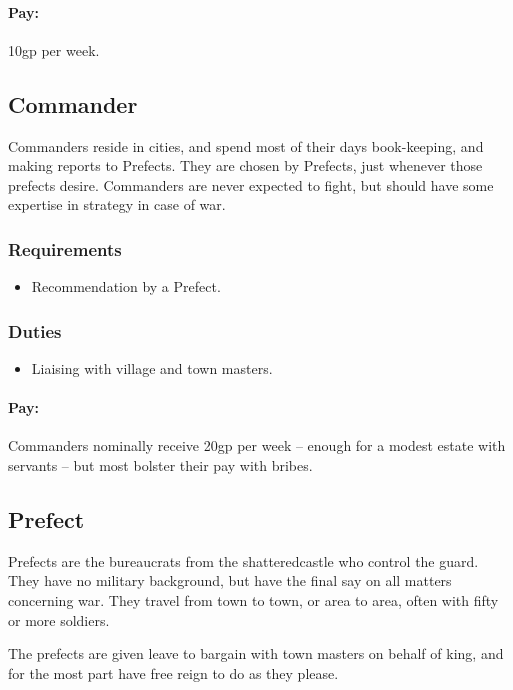\begin{multicols}{2}
\paragraph{Pay:}
10gp per week.

\subsection{Commander}

Commanders reside in cities, and spend most of their days book-keeping, and making reports to Prefects.
They are chosen by Prefects, just whenever those prefects desire.
Commanders are never expected to fight, but should have some expertise in strategy in case of war.

\subsubsection{Requirements}

\begin{itemize}
  \item
  Recommendation by a Prefect.
\end{itemize}

\subsubsection{Duties}

\begin{itemize}
  \item
  Liaising with village and town masters.
\end{itemize}

\paragraph{Pay:}
Commanders nominally receive 20gp per week -- enough for a modest estate with servants -- but most bolster their pay with bribes.

\subsection{Prefect}

Prefects are the bureaucrats from the \gls{shatteredcastle} who control the \gls{guard}.
They have no military background, but have the final say on all matters concerning war.
They travel from town to town, or area to area, often with fifty or more soldiers.

The prefects are given leave to bargain with town masters on behalf of \gls{king}, and for the most part have free reign to do as they please.


\end{multicols}
